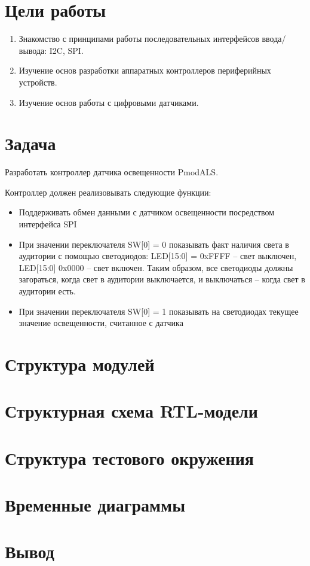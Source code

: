 

\usepackage{graphicx}
\fancyhead[LR]{}

\def \labnum {2}
\def \labsubj {Схемотехника ЭВМ}
\def \labauthor {Айтуганов Д. А. \\ Чебыкин И. Б.}
\def \labgroup {P3301}
\def \labinsp {Баевских А. Н.}
\def \labname {Вариант: 2}

\isnametrue
\lstset{  
	caption=\lstname,
	basicstyle=\ttfamily\selectfont\scriptsize
}



\tableofcontents
\newpage
\section{Цели работы}
\begin{enumerate}
\item Знакомство с принципами работы последовательных интерфейсов ввода/вывода: I2C, SPI.
\item Изучение основ разработки аппаратных контроллеров периферийных устройств.
\item Изучение основ работы с цифровыми датчиками.
\end{enumerate}

\section{Задача}
Разработать контроллер датчика освещенности PmodALS.

Контроллер должен реализовывать следующие функции:
\begin{itemize}
\item Поддерживать обмен данными с датчиком освещенности посредством интерфейса SPI
\item При значении переключателя SW[0] = 0 показывать факт наличия света в
аудитории с помощью светодиодов: LED[15:0] = 0xFFFF – свет выключен,
LED[15:0] 0x0000 – свет включен. Таким образом, все светодиоды должны
загораться, когда свет в аудитории выключается, и выключаться – когда свет в
аудитории есть.
\item При значении переключателя SW[0] = 1 показывать на светодиодах текущее
значение освещенности, считанное с датчика
\end{itemize}

\section{Структура модулей}




\section{Структурная схема RTL-модели}

\section{Структура тестового окружения}


\section{Временные диаграммы}
\section{Вывод}

